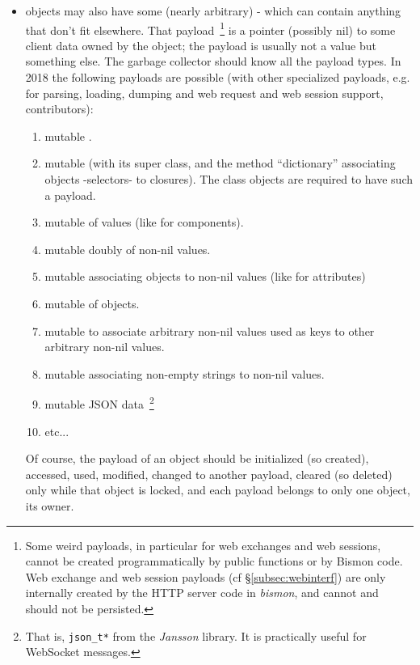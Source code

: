 \begin{itemize}
      \item objects may also have some (nearly arbitrary)
         - which can contain anything
        that don't fit elsewhere. That payload~\footnote{Some weird
          payloads, in particular for web exchanges and web sessions,
          cannot be created programmatically by public functions or by
          Bismon code. Web exchange and web session payloads (cf
          \S\ref{subsec:webinterf}) are only internally created by the
          HTTP server code in \emph{bismon}, and cannot and should not
          be persisted.} is a pointer (possibly nil) to some client
        data owned by the object; the payload is usually not a value
        but something else. The garbage collector should know all the
        payload types. In 2018 the following payloads are possible
        (with other specialized payloads, e.g. for parsing, loading,
        dumping and web request and web session support,
        contributors):

        \begin{enumerate}
        \item mutable .
          \item mutable  (with its super class, and
            the method ``dictionary'' associating objects -selectors-
            to closures). The class objects are required to have such
            a payload.
        \item mutable  of values (like
          for components).
        \item mutable  doubly  of non-nil values.
        \item mutable  associating objects to non-nil values (like for
          attributes)
        \item mutable  of objects.
        \item mutable  to associate arbitrary
            non-nil values used as keys to other arbitrary non-nil
            values.
        \item mutable  associating
          non-empty strings to non-nil values.
        \item mutable JSON  data~\footnote{That is, \texttt{json\_t*} from the \emph{Jansson} library. It is practically useful for WebSocket messages.} 
        \item etc...
        \end{enumerate}

        Of course, the payload of an object should be initialized (so
        created), accessed, used, modified, changed to another
        payload, cleared (so deleted) only while that object is
        locked, and each payload belongs to only one object, its
        owner.
       
\end{itemize}

